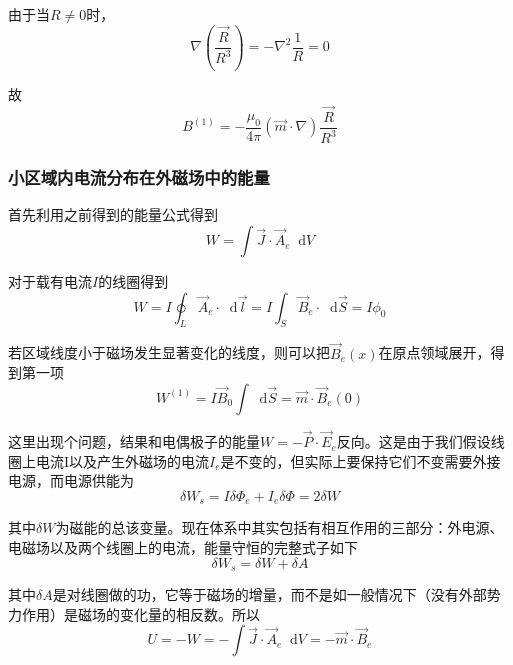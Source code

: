 \documentclass[UTF8]{ctexart}
\newcommand*{\dif}{\mathop{}\!\mathrm{d}}
\begin{document}
\noindent 由于当$R \ne 0$时， 
\begin{equation}
    \nabla \left(\frac{\vec{R}}{R^3}\right) = -\nabla^2 \frac{1}{R} = 0
\end{equation}

\noindent 故
\begin{equation}
    B^{(1)} = - \frac{\mu_0}{4 \pi} (\vec{m} \cdot \nabla) \frac{\vec{R}}{R^3}
\end{equation}

    \subsubsection{小区域内电流分布在外磁场中的能量}
    首先利用之前得到的能量公式得到
    \begin{equation}
        W = \int \vec{J} \cdot \vec{A}_e \dif V
    \end{equation}

\noindent 对于载有电流$I$的线圈得到
\begin{equation}
    W = I \oint_L \vec{A}_e \cdot \dif \vec{l} = I \int_S \vec{B}_e \cdot \dif \vec{S} = I \phi_0
\end{equation}

\noindent 若区域线度小于磁场发生显著变化的线度，则可以把$\vec{B}_e(x)$在原点领域展开，得到第一项
\begin{equation}
    W^{(1)} = I \vec{B}_0 \int \dif \vec{S} = \vec{m} \cdot \vec{B}_e(0)
\end{equation}

    这里出现个问题，结果和电偶极子的能量$W = - \vec{P} \cdot \vec{E}_e$反向。这是由于我们假设线圈上电流I以及产生外磁场的电流$I_e$是不变的，但实际上要保持它们不变需要外接电源，而电源供能为
    \begin{equation}
        \delta W_s = I \delta \Phi_e + I_e \delta \Phi = 2 \delta W
    \end{equation}

\noindent 其中$\delta W$为磁能的总该变量。现在体系中其实包括有相互作用的三部分：外电源、电磁场以及两个线圈上的电流，能量守恒的完整式子如下
\begin{equation}
    \delta W_s = \delta W + \delta A
\end{equation}

\noindent 其中$\delta A$是对线圈做的功，它等于磁场的增量，而不是如一般情况下（没有外部势力作用）是磁场的变化量的相反数。所以
\begin{equation}
    U = -W = - \int \vec{J} \cdot \vec{A}_e \dif V = - \vec{m} \cdot \vec{B}_e
\end{equation}
\end{document}
